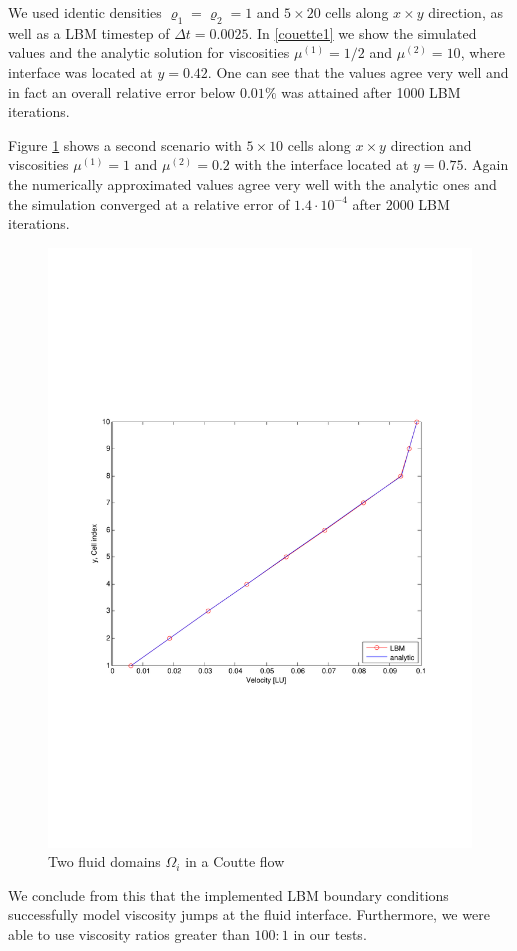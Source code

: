 \documentclass[final,leqno,onefignum,onetabnum]{siamltexmm}
\begin{document}
We used identic densities $\varrho_1 = \varrho_2 = 1$ and $5 \times 20$ cells along $x \times y$ direction, as well as a LBM timestep of $\Delta t=0.0025$. In \cref{couette1} we show the simulated values and the analytic solution for viscosities $\mu^{(1)} = 1/2$ and $\mu^{(2)} = 10$, where interface was located at $y=0.42$. One can see that the values agree very well and in fact an overall relative error below $0.01\%$ was attained after 1000 LBM iterations.

Figure \ref{couette2} shows a second scenario with $5 \times 10$ cells along $x \times y$ direction and viscosities $\mu^{(1)} = 1$ and $\mu^{(2)} = 0.2$ with the interface located at $y=0.75$. Again the numerically approximated values agree very well with the analytic ones and the simulation converged at a relative error of $1.4\cdot10^{-4}$ after 2000 LBM iterations.
\begin{figure}[t!]
	\flushright
	\hfill\includegraphics[trim = 0mm 8cm 0mm 8cm, clip, width=.8\textwidth, natwidth=595,natheight=842]{couette2.pdf}\hspace*{\fill}
	\caption{Two fluid domains $\Omega_i$ in a Coutte flow}
	\label{couette2}
\end{figure}
We conclude from this that the implemented LBM boundary conditions successfully model viscosity jumps at the fluid interface. Furthermore, we were able to use viscosity ratios greater than $100:1$ in our tests.
\end{document}

